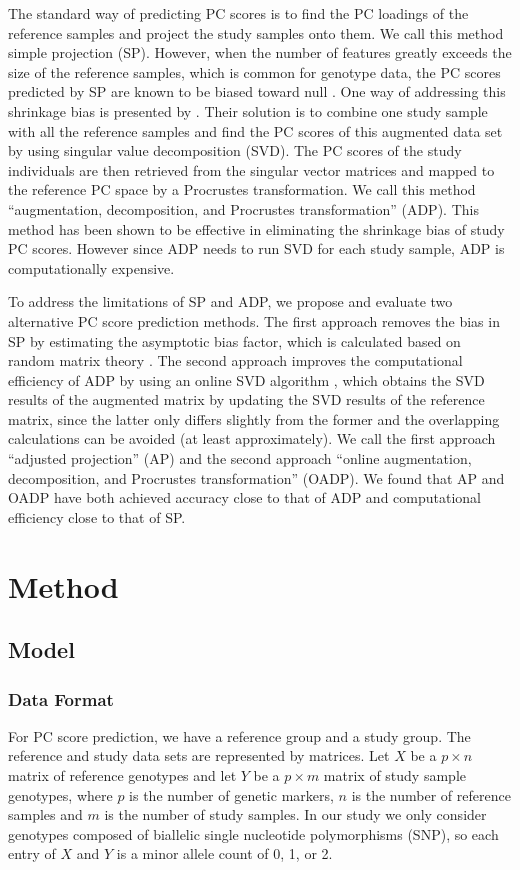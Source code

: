 \documentclass{article}
\begin{document}
The standard way of predicting PC scores is to find the PC loadings of the reference samples and project the study samples onto them.
We call this method simple projection (SP).
However, when the number of features greatly exceeds the size of the reference samples,
which is common for genotype data,
the PC scores predicted by SP are known to be biased toward null \citep{dey2016asymptotic}.
One way of addressing this shrinkage bias is presented by \citet{wang2014ancestry, wang2015improved}.
Their solution is to combine one study sample with all the reference samples and
find the PC scores of this augmented data set by using singular value decomposition (SVD).
The PC scores of the study individuals are then retrieved from the singular vector matrices and mapped to the reference PC space by a Procrustes transformation.
We call this method ``augmentation, decomposition, and Procrustes transformation'' (ADP).
This method has been shown to be effective in eliminating the shrinkage bias of study PC scores.
However since ADP needs to run SVD for each study sample,
ADP is computationally expensive.

To address the limitations of SP and ADP,
we propose and evaluate two alternative PC score prediction methods.
The first approach removes the bias in SP by estimating the asymptotic bias factor,
which is calculated based on random matrix theory \citep{dey2016asymptotic}.
The second approach improves the computational efficiency of ADP
by using an online SVD algorithm \citep{halko2011finding}, 
which obtains the SVD results of the augmented matrix
by updating the SVD results of the reference matrix,
since the latter only differs slightly from the former
and the overlapping calculations can be avoided
(at least approximately).
We call the first approach ``adjusted projection'' (AP)
and the second approach ``online augmentation, decomposition, and Procrustes transformation'' (OADP). 
We found that AP and OADP have both achieved accuracy close to that of ADP
and computational efficiency close to that of SP.

\section{Method}

\subsection{Model}

\subsubsection{Data Format}
For PC score prediction,
we have a reference group and a study group.
The reference and study data sets are represented by matrices.
Let $X$ be a $p \times n$ matrix of reference genotypes
and  let $Y$ be a $p \times m$ matrix of study sample genotypes,
where $p$ is the number of genetic markers,
$n$ is the number of reference samples
and $m$ is the number of study samples.
In our study we only consider genotypes composed of biallelic single nucleotide polymorphisms (SNP),
so each entry of $X$ and $Y$ is a minor allele count of 0, 1, or 2.
\end{document}
